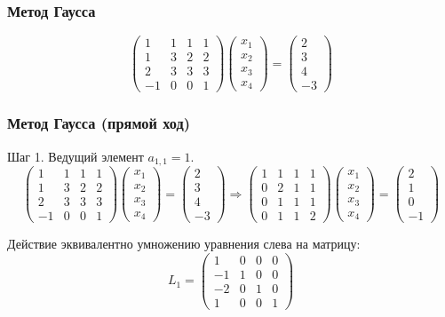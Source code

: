 \documentclass[10pt]{beamer}
\begin{document}
\begin{frame}[fragile]
\frametitle{Метод Гаусса}
$$
\begin{pmatrix}
1 & 1 & 1 & 1  \\
1 & 3 & 2 & 2 \\
2 & 3 & 3 & 3 \\
-1 & 0 & 0 & 1 
\end{pmatrix}
\begin{pmatrix}
x_1 \\
x_2 \\
x_3 \\
x_4
\end{pmatrix}
=
\begin{pmatrix}
2 \\
3 \\
4 \\
-3
\end{pmatrix}
$$

\end{frame}


\begin{frame}[fragile]
\frametitle{Метод Гаусса (прямой ход)}

Шаг 1. Ведущий элемент $a_{1,1} = 1$. 
$$
\begin{pmatrix}
1 & 1 & 1 & 1 \\
1 & 3 & 2 & 2 \\
2 & 3 & 3 & 3 \\
-1 & 0 & 0 & 1 
\end{pmatrix}
\begin{pmatrix}
x_1 \\
x_2 \\
x_3 \\
x_4
\end{pmatrix}
=
\begin{pmatrix}
2 \\
3 \\
4 \\
-3
\end{pmatrix}
\Rightarrow
\begin{pmatrix}
1 & 1 & 1 & 1 \\
0 & 2 & 1 & 1 \\
0 & 1 & 1 & 1 \\
0 & 1 & 1 & 2 
\end{pmatrix}
\begin{pmatrix}
x_1 \\
x_2 \\
x_3 \\
x_4
\end{pmatrix}
=
\begin{pmatrix}
2 \\
1 \\
0 \\
-1
\end{pmatrix}
$$

Действие эквивалентно умножению уравнения слева на матрицу:
$$
L_1 = 
\begin{pmatrix}
1 & 0 & 0 & 0 \\
-1 & 1 & 0 & 0 \\
-2 & 0 & 1 & 0 \\
1 & 0 & 0 & 1 
\end{pmatrix}
$$
\end{frame}
\end{document}
